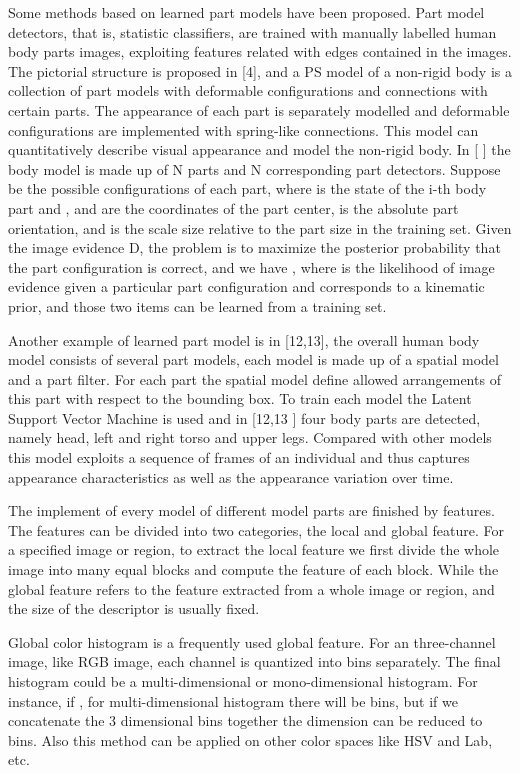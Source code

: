 Some methods based on learned part models have been proposed. Part model detectors, that is, statistic classifiers, are trained with manually labelled human body parts images, exploiting features related with edges contained in the images. The pictorial structure is proposed in [4], and a PS model of a non-rigid body is a collection of part models with deformable configurations and connections with certain parts. The appearance of each part is separately modelled and deformable configurations are implemented with spring-like connections. This model can quantitatively describe visual appearance and model the non-rigid body. In [ ] the body model is made up of N parts and N corresponding part detectors. Suppose  be the possible configurations of each part, where  is the state of the i-th body part and , and  are the coordinates of the part center,  is the absolute part orientation, and  is the scale size relative to the part size in the training set.  Given the image evidence D, the problem is to maximize the posterior  probability  that the part configuration is correct, and we have , where  is the likelihood of image evidence given a particular part configuration and  corresponds to a kinematic prior, and those two items can be learned from a training set.

Another example of learned part model is in [12,13], the overall human body model consists of several part models, each model is made up of a spatial model and a part filter. For each part the spatial model define allowed arrangements of this part with respect to the bounding box. To train each model the Latent Support Vector Machine is used and in [12,13 ] four body parts are detected, namely head, left and right torso and upper legs. Compared with other models this model exploits a sequence of frames of an individual and thus captures appearance characteristics as well as the appearance variation over time.

The implement of every model of different model parts are finished by features. The features can be divided into two categories, the local and global feature. For a specified image or region, to extract the local feature we first divide the whole image into many equal blocks and compute the feature of each block. While the global feature refers to the feature extracted from a whole image or region, and the size of the descriptor is usually fixed. 

Global color histogram is a frequently used global feature. For an three-channel image, like RGB image, each channel is quantized into  bins separately. The final histogram could be a multi-dimensional or mono-dimensional histogram. For instance, if , for multi-dimensional histogram there will be  bins, but if we concatenate the 3 dimensional bins together the dimension can be reduced to  bins. Also this method can be applied on other color spaces like HSV and Lab, etc.

